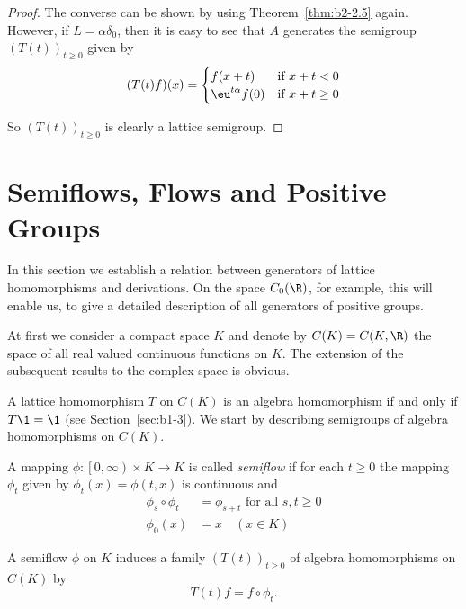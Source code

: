 \begin{proof}
The converse can be shown by using Theorem~\ref{thm:b2-2.5} again.
However, if\/ $L = \alpha\delta_{0}$, then it is easy to see that $A$ generates the semigroup $(T(t))_{t \geq 0}$ given by
\begin{equation*}
(T(t)f)(x) = \begin{cases}
    f(x+t) & \text{if } x+t < 0 \\
    \eu^{t\alpha}f(0) & \text{if } x+t \geq 0
\end{cases}
\end{equation*}

So $(T(t))_{t \geq 0}$ is clearly a lattice semigroup.
\end{proof}
\section{Semiflows, Flows and Positive Groups}\label{sec:b2-3}
In this section we establish a relation between generators of lattice homomorphisms and derivations.
On the space $C_{0}(\R)$, for example, this will enable us, to give a detailed description of all generators of positive groups.

At first we consider a compact space $K$ and denote by $C(K) = C(K,\R)$ the space of all real valued continuous functions on $K$.
The extension of the subsequent results to the complex space is obvious.

A lattice homomorphism $T$ on $C(K)$ is an algebra homomorphism if and only if\/ $T \1 = \1$ (see Section~\ref{sec:b1-3}).
We start by describing semigroups of algebra homomor\-phisms on $C(K)$.

\begin{definition}\label{def:b2-3.1}
A mapping $\phi \colon \left[0,\infty\right) \times K \to K$ is called \emph{semiflow} if for each $t \geq 0$ the mapping $\phi_{t}$ given by $\phi_{t}(x) = \phi(t,x)$ is continuous and
\begin{align}
\phi_{s} \circ \phi_{t} &= \phi_{s+t} \text{ for all } s,t \geq 0 \label{eq:b2-3.1} \\
\phi_{0}(x) &= x \quad (x \in K) \label{eq:b2-3.2}
\end{align}
\end{definition}

A semiflow $\phi$ on $K$ induces a family $(T(t))_{t \geq 0}$ of algebra homomorphisms on $C(K)$ by
\begin{equation}\label{eq:b2-3.3}
T(t)f = f \circ \phi_{t}.
\end{equation}

